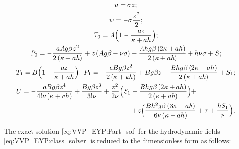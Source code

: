 \begin{gather}

u=\sigma z;

\\

w= -\sigma \frac{z^2}{2};

\\

T_0=A\Bigl(1-\frac{az}{\kappa+ah}\Bigr);

\\

       \label{eq:VVP_EYP:Part_sol}

P_0=-\frac{aAg\beta z^2}{2\left(\kappa+ah\right)}+z\left(Ag\beta - \nu \sigma\right)-\frac{Ahg\beta \left(2\kappa+ah\right)}{2\left(\kappa+ah\right)}+h\nu \sigma + S;

\\ 

T_1=B\Bigl(1-\frac{az}{\kappa+ah}\Bigr), \; 

P_1=-\frac{aBg\beta z^2}{2\left(\kappa+ah\right)}+Bg\beta z -\frac{Bhg\beta \left(2\kappa+ah\right)}{2\left(\kappa+ah\right)} + S_1;

\\

U=-\frac{aBg\beta z^4}{4!\nu \left(\kappa+ah\right)}+\frac{Bg\beta z^3}{3!\nu}+\frac{z^2}{2\nu}

\Bigl(S_1-\frac{Bhg\beta \left(2\kappa+ah\right)}{2\left(\kappa+ah\right)} \Bigr) + \hspace{2cm}

\\

\hspace{6cm}

+ z \Bigl(\frac{Bh^2g\beta \left(3\kappa+ah\right)}{6\nu \left(\kappa+ah\right)} + \tau + \frac{hS_1}{\nu} \Bigr).

 \end{gather}

The exact solution \eqref{eq:VVP_EYP:Part_sol} for the hydrodynamic fields \eqref{eq:VVP_EYP:class_solver} is reduced to the dimensionless form as follows:  


